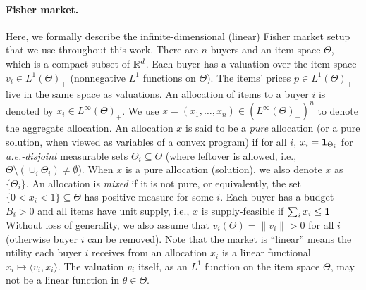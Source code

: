 \paragraph{Fisher market.} 
Here, we formally describe the infinite-dimensional (linear) Fisher market setup that we use throughout this work. 
There are $n$ buyers and an item space $\Theta$, which is a compact subset of $\mathbb{R}^d$.  
Each buyer has a valuation over the item space $v_i\in L^1(\Theta)_+$ (nonnegative $L^1$ functions on $\Theta$). 
The items' prices $p\in L^1(\Theta)_+$ live in the same space as valuations. 
An allocation of items to a buyer $i$ is denoted by $x_i \in L^\infty(\Theta)_+$. We use $x = (x_1, \dots, x_n) \in (L^\infty(\Theta)_+)^n$ to denote the aggregate allocation. 
An allocation $x$ is said to be a \textit{pure} allocation (or a pure solution, when viewed as variables of a convex program) if for all $i$, $x_i = \mathbf{1}_{\Theta_i}$ for \textit{a.e.-disjoint} measurable sets $\Theta_i\subseteq \Theta$ (where leftover is allowed, i.e., $\Theta \setminus (\cup_i \Theta_i) \neq \emptyset$). 
When $x$ is a pure allocation (solution), we also denote $x$ as $\{\Theta_i\}$. 
An allocation is \textit{mixed} if it is not pure, or equivalently, the set $\{0< x_i < 1\} \subseteq \Theta$ has positive measure for some $i$. 
Each buyer has a budget $B_i > 0$ and all items have unit supply, i.e., $x$ is supply-feasible if $\sum_i x_i \leq \mathbf{1}$ 
 Without loss of generality, we also assume that $v_i(\Theta) = \|v_i \| > 0$ for all $i$ (otherwise buyer $i$ can be removed).
Note that the market is ``linear'' means the utility each buyer $i$ receives from an allocation $x_i$ is a linear functional $ x_i \mapsto \langle v_i, x_i \rangle$. The valuation $v_i$ itself, as an $L^1$ function on the item space $\Theta$, may not be a linear function in $\theta\in \Theta$.
